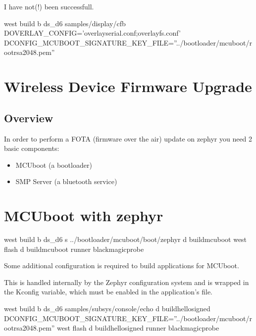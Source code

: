 \documentclass[letterpaper,10pt,english]{sphinxmanual}
\begin{document}
I have not(!) been successfull.

west build \sphinxhyphen{}b ds\_d6 samples/display/cfb \textendash{} \sphinxhyphen{}DOVERLAY\_CONFIG=’overlay\sphinxhyphen{}serial.conf;overlay\sphinxhyphen{}fs.conf’  \sphinxhyphen{}DCONFIG\_MCUBOOT\_SIGNATURE\_KEY\_FILE=”../bootloader/mcuboot/root\sphinxhyphen{}rsa\sphinxhyphen{}2048.pem”


\section{Wireless Device Firmware Upgrade}
\label{\detokenize{fota/mcuboot:wireless-device-firmware-upgrade}}

\subsection{Overview}
\label{\detokenize{fota/mcuboot:overview}}
In order to perform a FOTA (firmware over the air) update on zephyr you need 2 basic components:
\begin{itemize}
\item {} 
MCUboot   (a bootloader)

\item {} 
SMP Server (a bluetooth service)

\end{itemize}


\section{MCUboot with zephyr}
\label{\detokenize{fota/mcuboot:mcuboot-with-zephyr}}\label{\detokenize{fota/mcuboot:id1}}
west build \sphinxhyphen{}b ds\_d6 \sphinxhyphen{}s ../bootloader/mcuboot/boot/zephyr \sphinxhyphen{}d build\sphinxhyphen{}mcuboot
west flash \sphinxhyphen{}d build\sphinxhyphen{}mcuboot \textendash{}runner blackmagicprobe

Some additional configuration is required to build applications for MCUboot.

This is handled internally by the Zephyr configuration system and is wrapped
in the  Kconfig variable, which must be enabled in
the application’s  file.

west build \sphinxhyphen{}b ds\_d6 samples/subsys/console/echo \sphinxhyphen{}d build\sphinxhyphen{}hello\sphinxhyphen{}signed \sphinxhyphen{}DCONFIG\_MCUBOOT\_SIGNATURE\_KEY\_FILE=”../bootloader/mcuboot/root\sphinxhyphen{}rsa\sphinxhyphen{}2048.pem”
west flash \sphinxhyphen{}d build\sphinxhyphen{}hello\sphinxhyphen{}signed \textendash{}runner blackmagicprobe
\end{document}
